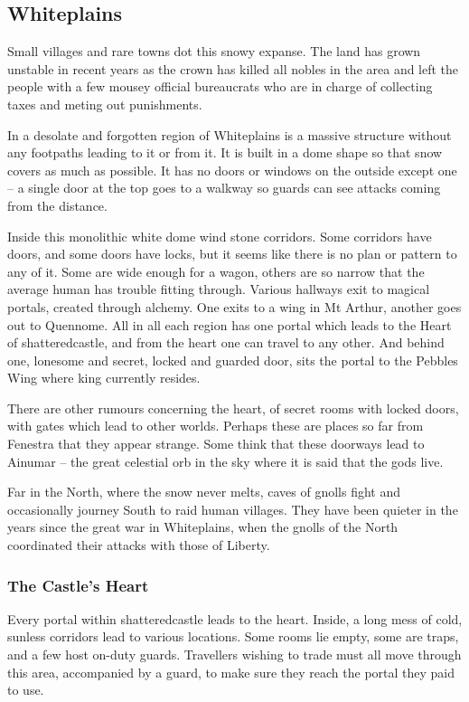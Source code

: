 \begin{multicols}{2}
\subsection{Whiteplains}

Small villages and rare towns dot this snowy expanse.  The land has grown unstable in recent years as the crown has killed all nobles in the area and left the people with a few mousey official bureaucrats who are in charge of collecting taxes and meting out punishments.

In a desolate and forgotten region of Whiteplains is a massive structure without any footpaths leading to it or from it.
It is built in a dome shape so that snow covers as much as possible.
It has no doors or windows on the outside except one -- a single door at the top goes to a walkway so guards can see attacks coming from the distance.

Inside this monolithic white dome wind stone corridors.
Some corridors have doors, and some doors have locks, but it seems like there is no plan or pattern to any of it.
Some are wide enough for a wagon, others are so narrow that the average human has trouble fitting through.
Various hallways exit to magical portals, created through alchemy.
One exits to a wing in Mt Arthur, another goes out to Quennome.
All in all each region has one portal which leads to the Heart of \gls{shatteredcastle}, and from the heart one can travel to any other.
And behind one, lonesome and secret, locked and guarded door, sits the portal to the Pebbles Wing where \gls{king} currently resides.

There are other rumours concerning the heart, of secret rooms with locked doors, with gates which lead to other worlds.  Perhaps these are places so far from Fenestra that they appear strange.  Some think that these doorways lead to Ainumar -- the great celestial orb in the sky where it is said that the gods live.

Far in the North, where the snow never melts, caves of gnolls fight and occasionally journey South to raid human villages.
They have been quieter in the years since the great war in Whiteplains, when the gnolls of the North coordinated their attacks with those of Liberty.

\subsubsection{The Castle's Heart}\label{whiteland_heart}

Every portal within \gls{shatteredcastle} leads to the heart.
Inside, a long mess of cold, sunless corridors lead to various locations.
Some rooms lie empty, some are traps, and a few host on-duty guards.
Travellers wishing to trade must all move through this area, accompanied by a guard, to make sure they reach the portal they paid to use.


\end{multicols}

